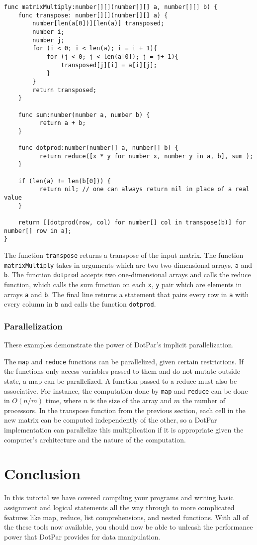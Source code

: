 \begin{verbatim}
func matrixMultiply:number[][](number[][] a, number[][] b) {
    func transpose: number[][](number[][] a) {
        number[len(a[0])][len(a)] transposed;
        number i;
        number j;
        for (i < 0; i < len(a); i = i + 1){
            for (j < 0; j < len(a[0]); j = j+ 1){
                transposed[j][i] = a[i][j];
            }
        }
        return transposed;
    }

    func sum:number(number a, number b) {
          return a + b;
    }

    func dotprod:number(number[] a, number[] b) {
          return reduce([x * y for number x, number y in a, b], sum );
    }

    if (len(a) != len(b[0])) {
          return nil; // one can always return nil in place of a real value
    }

    return [[dotprod(row, col) for number[] col in transpose(b)] for number[] row in a];
}
\end{verbatim}

The function \verb=transpose= returns a transpose of the input matrix. The
function \verb=matrixMultiply= takes in arguments which are two two-dimensional
arrays, \verb=a= and \verb=b=. The function \verb=dotprod= accepts two
one-dimensional arrays and calls the reduce function, which calls the sum
function on each \verb=x=, \verb=y= pair which are elements in arrays \verb=a=
and \verb=b=. The final line returns a statement that pairs every row in
\verb=a= with every column in \verb=b= and calls the function \verb=dotprod=.

\subsubsection{Parallelization}
These examples demonstrate the power of DotPar's implicit parallelization.

The \verb=map= and \verb=reduce= functions can be parallelized, given certain
restrictions. If the functions only access variables passed to them and do not
mutate outside state, a map can be parallelized. A function passed to a reduce
must also be associative.
For instance, the computation done
by \verb=map= and \verb=reduce= can be done in $O(n/m)$ time, where $n$ is the
size of the array and $m$ the number of processors. In the transpose function
from the previous section, each cell in the new matrix can be computed
independently of the other, so a DotPar implementation can parallelize this
multiplication if it is appropriate given the computer's architecture and the
nature of the computation.

\section{Conclusion}

In this tutorial we have covered compiling your programs and writing basic
assignment and logical statements all the way through to more complicated
features like map, reduce, list comprehensions, and nested functions. With all
of the these tools now available, you should now be able to unleash the
performance power that DotPar provides for data manipulation.
